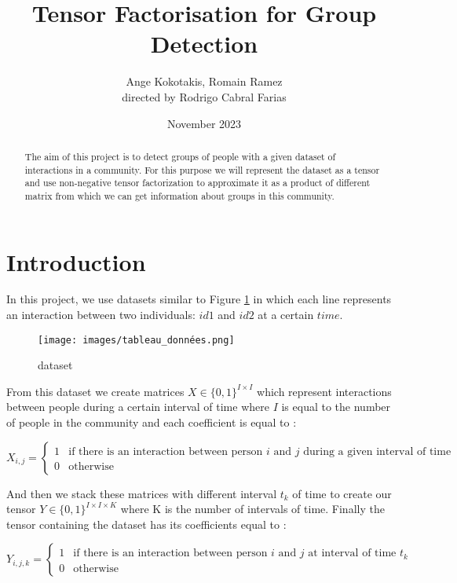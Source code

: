 \documentclass{article}
\title{Tensor Factorisation for Group Detection}
\author{ Ange Kokotakis, Romain Ramez \\ \small directed by Rodrigo Cabral Farias}
\date{November 2023}
\begin{document}
\maketitle

\begin{abstract}
    The aim of this project is to detect groups of people with a given dataset of interactions in a community.
    For this purpose we will represent the dataset as a tensor and use non-negative tensor factorization to approximate
    it as a product of different matrix from which we can get information about groups in this community.
\end{abstract}

\section{Introduction}

In this project, we use datasets similar to Figure \ref{dataset} in which each line represents an interaction between
two individuals: $id1$ and $id2$ at a certain $time$.

\begin{figure}[h]
    \centering
    \texttt{[image: images/tableau\_données.png]}
    \caption{dataset}
    \label{dataset}
\end{figure}

From this dataset we create matrices $X \in \{0, 1\}^{I \times I}$ which represent interactions between people during a certain
interval of time where $I$ is equal to the number of people in the community and each coefficient is equal to :

\[
    X_{i,j} = 
    \begin{cases}
        1 & \text{if there is an interaction between person $i$ and $j$ during a given interval of time} \\
        0 & \text{otherwise}
    \end{cases}
\]

And then we stack these matrices with different interval $t_k$ of time to create our tensor $Y \in \{0, 1\}^{I \times I \times K}$
where K is the number of intervals of time. Finally the tensor containing the dataset has its coefficients equal to :

\[
    Y_{i,j,k} = 
    \begin{cases}
        1 & \text{if there is an interaction between person $i$ and $j$ at interval of time $t_k$} \\
        0 & \text{otherwise}
    \end{cases}
\]
\end{document}

